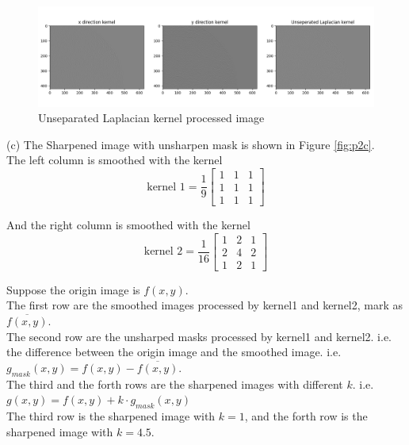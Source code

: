 \begin{figure}[htbp]
    \centering
	\includegraphics[width=\textwidth]{../images/p2/p2b.png}
    \caption{Unseparated Laplacian kernel processed image}
\label{fig:p2b}
\end{figure}

(c) The Sharpened image with unsharpen mask is shown in Figure \ref{fig:p2c}.\\
The left column is smoothed with the kernel 
$$\text{kernel\ 1}=\dfrac{1}{9}\begin{bmatrix}1 & 1 & 1\\1 & 1 & 1\\1 & 1 & 1\end{bmatrix}$$

And the right column is smoothed with the kernel
$$\text{kernel\ 2}=\dfrac{1}{16}\begin{bmatrix}1 & 2 & 1\\2 & 4 & 2\\1 & 2 & 1\end{bmatrix}$$

Suppose the origin image is $f(x,y)$.\\
The first row are the smoothed images processed by kernel1 and kernel2, mark as $\overline{f(x,y)}$.\\
The second row are the unsharped masks processed by kernel1 and kernel2. i.e. the difference between the
origin image and the smoothed image. i.e. $g_{mask}(x,y)=f(x,y)-\overline{f(x,y)}$.\\
The third and the forth rows are the sharpened images with different $k$. i.e. $g(x,y)=f(x,y)+k\cdot g_{mask}(x,y)$\\
The third row is the sharpened image with $k=1$, and the forth row is the sharpened image with $k=4.5$.\\

